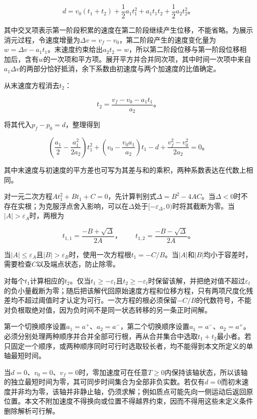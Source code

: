 \documentclass[UTF8,a4paper,12pt,fontset=fandol]{ctexart}
\begin{document}
\[
d=v_0(t_1+t_2)+\frac12a_1t_1^2+a_1t_1t_2+\frac12a_2t_2^2\text{。}
\]

其中交叉项表示第一阶段积累的速度在第二阶段继续产生位移，不能省略。为展示消元过程，令速度增量为\(\Delta v=v_f-v_0\)，第二阶段产生的速度变化量为\(w=\Delta v-a_1t_1\)。末速度约束给出\(a_2t_2=w\)，所以第二阶段位移与第一阶段位移相加后，含有\(w\)的一次项和平方项。展开平方并合并同次项，其中时间一次项中来自\(a_1\Delta v\)的两部分恰好抵消，余下系数由初速度与两个加速度的比值确定。

从末速度方程消去\(t_2\)：

\[
t_2=\frac{v_f-v_0-a_1t_1}{a_2}\text{。}
\]

将其代入\(p_f-p_0=d\)，整理得到

\[
\left(\frac{a_1}{2}-\frac{a_1^2}{2a_2}\right)t_1^2
+\left(v_0-\frac{v_0a_1}{a_2}\right)t_1
-d+\frac{v_f^2-v_0^2}{2a_2}=0\text{。}
\]

其中末速度与初速度的平方差也可写为其差与和的乘积，两种系数表达在代数上相同。

对一元二次方程\(At_1^2+Bt_1+C=0\)，先计算判别式\(\Delta=B^2-4AC\)。当\(\Delta<0\)时不存在实根；为克服浮点舍入影响，可以在\(\Delta\)处于\([-\varepsilon_\Delta,0)\)时将其截断为零。当\(|A|>\varepsilon_A\)时，两根为

\[
t_{1,1}=\frac{-B+\sqrt\Delta}{2A}\text{，}\qquad
t_{1,2}=\frac{-B-\sqrt\Delta}{2A}\text{。}
\]

当\(|A|\le\varepsilon_A\)且\(|B|>\varepsilon_B\)时，使用一次方程根\(t_1=-C/B\)。当\(|A|\)和\(|B|\)均小于容差时，需要检查\(C\)以及端点状态，防止除零。

对每个\(t_1\)计算相应的\(t_2\)。仅当\(t_1\ge-\varepsilon_t\)且\(t_2\ge-\varepsilon_t\)时保留该解，并把绝对值不超过\(\varepsilon_t\)的负小量截断为零；随后把该解代回原始速度方程和位移方程，只有两项尺度化残差均不超过阈值时才认定为可行。一次方程的根必须保留\(-C/B\)的代数符号，不能对负根取绝对值，因为负时间不是同一状态转移的另一条正时间解。

第一个切换顺序设置\(a_1=a^+\)、\(a_2=a^-\)，第二个切换顺序设置\(a_1=a^-\)、\(a_2=a^+\)。必须分别处理两种顺序并合并全部可行根，再从合并集合中选取\(t_1+t_2\)最小者。若只固定一个顺序，或两种顺序同时可行时选取较长者，均不能得到本文所定义的单轴最短时间。

当\(d=0\)、\(v_0=0\)、\(v_f=0\)时，零加速度可在任意\(T\ge0\)内保持该轴状态，所以该轴的独立最短时间为零，其可同步时间集合为全部非负实数。若仅有\(d=0\)而初末速度并非均为零，该轴并非静止轴，仍须求解；例如质点可能先向一侧运动后返回原位置。本文不附加速度不得换向或位置不得越界约束，因而不得用这些未定义条件删除解析可行解。
\end{document}
